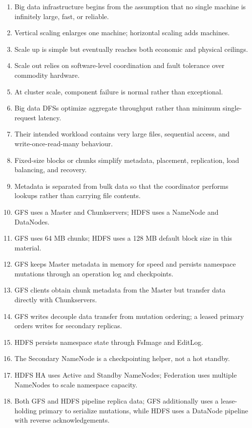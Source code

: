 \documentclass[11pt,a4paper,oneside]{book}
\begin{document}
\begin{enumerate}
    \item Big data infrastructure begins from the assumption that no single machine is infinitely large, fast, or reliable.
    \item Vertical scaling enlarges one machine; horizontal scaling adds machines.
    \item Scale up is simple but eventually reaches both economic and physical ceilings.
    \item Scale out relies on software-level coordination and fault tolerance over commodity hardware.
    \item At cluster scale, component failure is normal rather than exceptional.
    \item Big data DFSs optimize aggregate throughput rather than minimum single-request latency.
    \item Their intended workload contains very large files, sequential access, and write-once-read-many behaviour.
    \item Fixed-size blocks or chunks simplify metadata, placement, replication, load balancing, and recovery.
    \item Metadata is separated from bulk data so that the coordinator performs lookups rather than carrying file contents.
    \item GFS uses a Master and Chunkservers; HDFS uses a NameNode and DataNodes.
    \item GFS uses 64 MB chunks; HDFS uses a 128 MB default block size in this material.
    \item GFS keeps Master metadata in memory for speed and persists namespace mutations through an operation log and checkpoints.
    \item GFS clients obtain chunk metadata from the Master but transfer data directly with Chunkservers.
    \item GFS writes decouple data transfer from mutation ordering; a leased primary orders writes for secondary replicas.
    \item HDFS persists namespace state through FsImage and EditLog.
    \item The Secondary NameNode is a checkpointing helper, not a hot standby.
    \item HDFS HA uses Active and Standby NameNodes; Federation uses multiple NameNodes to scale namespace capacity.
    \item Both GFS and HDFS pipeline replica data; GFS additionally uses a lease-holding primary to serialize mutations, while HDFS uses a DataNode pipeline with reverse acknowledgements.

\end{enumerate}
\end{document}
